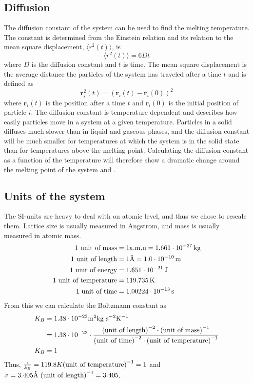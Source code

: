 \documentclass{article}
\begin{document}
\subsection{Diffusion}
The diffusion constant of the system can be used to find the melting temperature. The constant is determined from the Einstein relation and its relation to the mean square displacement, $\langle r^2(t)\rangle$, is
$$\langle r^2(t)\rangle = 6Dt$$
where $D$ is the diffusion constant and $t$ is time. The mean square displacement is the average distance the particles of the system has traveled after a time $t$ and is defined as
$$\mathbf{r}_i^2(t)=(\mathbf{r}_i(t)-\mathbf{r}_i(0))^2$$
where $\mathbf{r}_i(t)$ is the position after a time $t$ and $\mathbf{r}_i(0)$ is the initial position of particle $i$. The diffusion constant is temperature dependent and describes how easily particles move in a system at a given temperature. Particles in a solid diffuses much slower than in liquid and gaseous phases, and the diffusion constant will be much smaller for temperatures at which the system is in the solid state than for temperatures above the melting point. Calculating the diffusion constant as a function of the temperature will therefore show a dramatic change around the melting point of the system and .


\subsection{Units of the system}

The SI-units are heavy to deal with on atomic level, and thus we chose to rescale them. Lattice size is usually measured in Angstrom, and mass is usually measured in atomic mass.
\begin{align}
	1 \textnormal{ unit of mass} &= 1 \textnormal{a.m.u} = 1.661\cdot 10^{-27}\, \textnormal{kg}\\
	1 \textnormal{ unit of length} &= 1 \textnormal{\AA} = 1.0\cdot 10^{-10}\, \textnormal{m}\\
	1 \textnormal{ unit of energy} &= 1.651\cdot 10^{-21}\,\textnormal{J}\\
	1 \textnormal{ unit of temperature} &= 119.735\,\textnormal{K}\\
	1 \textnormal{ unit of time} &= 1.00224\cdot 10^{-13}\, \textnormal{s}
\end{align}
From this we can calculate the Boltzmann constant as
\begin{align}
	K_B &= 1.38\cdot 10^{-23} \textnormal{m}^2\textnormal{kg}\textnormal{ s}^{-2}\textnormal{K}^{-1}\\
	&= 1.38\cdot 10^{-23} \cdot \frac{\textnormal{(unit of length)}^{-2}\cdot\textnormal{(unit of mass)}^{-1}}{\textnormal{(unit of time)}^{-2}\cdot\textnormal{(unit of temperature)}^{-1}}\\
	K_B &=1
\end{align}
Thus, $\frac{\epsilon}{k_B}=119.8K \textnormal{(unit of temperature)}^{-1}=1$ and $\sigma = 3.405 \textnormal{Å}\textnormal{ (unit of length)}^{-1} = 3.405$.
\end{document}
